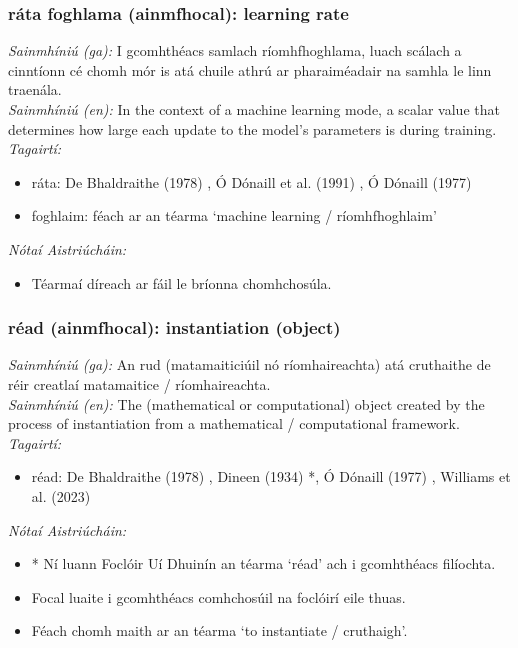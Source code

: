 \documentclass{article}
\begin{document}
\subsubsection*{ráta foghlama (ainmfhocal): learning rate}
 \noindent \textit{Sainmhíniú (ga):} I gcomhthéacs samlach ríomhfhoghlama, luach scálach a cinntíonn cé chomh mór is atá chuile athrú ar pharaiméadair na samhla le linn traenála.
\\
 \noindent \textit{Sainmhíniú (en):} In the context of a machine learning mode, a scalar value that determines how large each update to the model's parameters is during training.
\\
 \noindent \textit{Tagairtí:}
\begin{itemize}
	\item ráta: De Bhaldraithe (1978) \cite{de-bhaldraithe}, Ó Dónaill et al. (1991) \cite{focloir-beag}, Ó Dónaill (1977) \cite{odonaill}
	\item foghlaim: féach ar an téarma `machine learning / ríomhfhoghlaim'
\end{itemize}

 \noindent \textit{Nótaí Aistriúcháin:}
\begin{itemize}
	\item Téarmaí díreach ar fáil le bríonna chomhchosúla.
\end{itemize}


\subsubsection*{réad (ainmfhocal): instantiation (object)}
 \noindent \textit{Sainmhíniú (ga):} An rud (matamaiticiúil nó ríomhaireachta) atá cruthaithe de réir creatlaí matamaitice / ríomhaireachta.
\\
 \noindent \textit{Sainmhíniú (en):} The (mathematical or computational) object created by the process of instantiation from a mathematical / computational framework.
\\
 \noindent \textit{Tagairtí:}
\begin{itemize}
	\item réad: De Bhaldraithe (1978) \cite{de-bhaldraithe}, Dineen (1934) \cite{dineen}*, Ó Dónaill (1977) \cite{odonaill}, Williams et al. (2023) \cite{storchiste}
\end{itemize}

 \noindent \textit{Nótaí Aistriúcháin:}
\begin{itemize}
	\item * Ní luann Foclóir Uí Dhuinín an téarma `réad' ach i gcomhthéacs filíochta.
	\item Focal luaite i gcomhthéacs comhchosúil na foclóirí eile thuas.
	\item Féach chomh maith ar an téarma `to instantiate / cruthaigh'.
\end{itemize}
\end{document}
